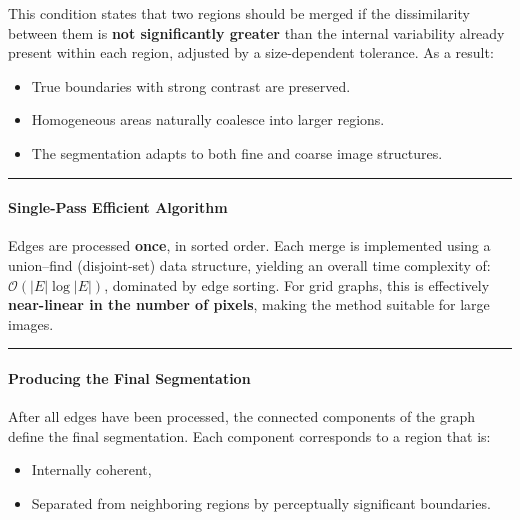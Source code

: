 \documentclass[11pt]{article}
\providecommand{\tightlist}{%
      \setlength{\itemsep}{0pt}\setlength{\parskip}{0pt}}
\begin{document}
This condition states that two regions should be merged if the
dissimilarity between them is \textbf{not significantly greater} than
the internal variability already present within each region, adjusted by
a size-dependent tolerance. As a result:

\begin{itemize}
\tightlist
\item
  True boundaries with strong contrast are preserved.
\item
  Homogeneous areas naturally coalesce into larger regions.
\item
  The segmentation adapts to both fine and coarse image structures.
\end{itemize}

\begin{center}\rule{0.5\linewidth}{0.5pt}\end{center}

\hypertarget{single-pass-efficient-algorithm}{%
\paragraph{\texorpdfstring{\textbf{Single-Pass Efficient
Algorithm}}{Single-Pass Efficient Algorithm}}\label{single-pass-efficient-algorithm}}

Edges are processed \textbf{once}, in sorted order. Each merge is
implemented using a union--find (disjoint-set) data structure, yielding
an overall time complexity of: \(\mathcal{O}(|E| \log |E|)\), dominated
by edge sorting. For grid graphs, this is effectively
\textbf{near-linear in the number of pixels}, making the method suitable
for large images.

\begin{center}\rule{0.5\linewidth}{0.5pt}\end{center}

\hypertarget{producing-the-final-segmentation}{%
\paragraph{\texorpdfstring{\textbf{Producing the Final
Segmentation}}{Producing the Final Segmentation}}\label{producing-the-final-segmentation}}

After all edges have been processed, the connected components of the
graph define the final segmentation. Each component corresponds to a
region that is:

\begin{itemize}
\tightlist
\item
  Internally coherent,
\item
  Separated from neighboring regions by perceptually significant
  boundaries.
\end{itemize}
\end{document}
